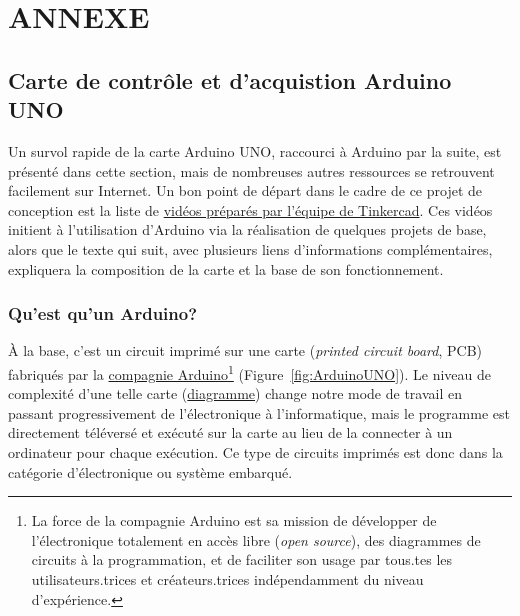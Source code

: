\documentclass[english,french,12pt]{article}
\begin{document}

\newpage
%
\justify
\section*{ANNEXE}
\label{sec:annexe}

\subsection*{Carte de contrôle et d'acquistion Arduino UNO}
Un survol rapide de la carte Arduino UNO, raccourci à Arduino par la suite, est présenté dans cette section, mais de nombreuses autres ressources se retrouvent facilement sur Internet. Un bon point de départ dans le cadre de ce projet de conception est la liste de \href{https://www.youtube.com/playlist?list=PLV6cmKvnKRs5geApVORPW79U6s3wpa0Ht}{vidéos préparés par l'équipe de Tinkercad}. Ces vidéos initient à l'utilisation d'Arduino via la réalisation de quelques projets de base, alors que le texte qui suit, avec plusieurs liens d'informations complémentaires, expliquera la composition de la carte et la base de son fonctionnement. 

\subsubsection*{Qu'est qu'un Arduino?}
À la base, c'est un circuit imprimé sur une carte (\textit{printed circuit board}, PCB) fabriqués par la \href{https://www.arduino.cc/}{ compagnie Arduino}\footnote{La force de la compagnie Arduino est sa mission de développer de l'électronique totalement en accès libre (\textit{open source}), des diagrammes de circuits à la programmation, et de faciliter son usage par tous.tes les utilisateurs.trices et créateurs.trices indépendamment du niveau d'expérience.} (Figure~\ref{fig:ArduinoUNO}). Le niveau de complexité d'une telle carte (\href{https://content.arduino.cc/assets/UNO-TH_Rev3e_sch.pdf}{diagramme}) change notre mode de travail en passant progressivement de l'électronique à l'informatique, mais le programme est directement téléversé et exécuté sur la carte au lieu de la connecter à un ordinateur pour chaque exécution. Ce type de circuits imprimés est donc dans la catégorie d'électronique ou système embarqué.
\end{document}
